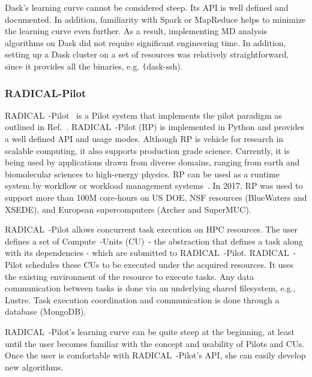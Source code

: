 Dask's learning curve cannot be considered steep.
Its API is well defined and documented.
In addition, familiarity with Spark or MapReduce helps to minimize the learning curve even further.
As a result, implementing MD analysis algorithms on Dask did not require significant engineering time.
In addition, setting up a Dask cluster on a set of resources was relatively straightforward, since it provides all the binaries, e.g. \texttt(dask-ssh).

\subsubsection*{RADICAL-Pilot}
RADICAL~-Pilot~\cite{merzky2019using} is a Pilot system that implements the pilot paradigm as outlined in Ref.~\cite{turilli2018comprehensive}.
RADICAL~-Pilot (RP) is implemented in Python and provides a well defined API and usage modes.
Although RP is vehicle for research in scalable computing, it also supports production grade science.
Currently, it is being used by applications drawn from diverse domains, ranging from earth and biomolecular sciences to high-energy physics.
RP can be used as a runtime system by workflow or workload management systems~\cite{turilli2019middleware,treikalis2016repex,balasubramanian2018harnessing,dakka2018high,turilli2017evaluating}.
In 2017, RP was used to support more than 100M core-hours on US DOE, NSF resources (BlueWaters and XSEDE), and European supercomputers (Archer and SuperMUC).

RADICAL~-Pilot allows concurrent task execution on HPC resources.
The user defines a set of Compute~-Units (CU)~- the abstraction that defines a task along with its dependencies - which are submitted to RADICAL~-Pilot.
RADICAL~-Pilot schedules these CUs to be executed under the acquired resources.
It uses the existing environment of the resource to execute tasks.
Any data communication between tasks is done via an underlying shared filesystem, e.g., Lustre.
Task execution coordination and communication is done through a database (MongoDB).

RADICAL~-Pilot's learning curve can be quite steep at the beginning, at least until the user becomes familiar with the concept and usability of Pilots and CUs.
Once the user is comfortable with RADICAL~-Pilot's API, she can easily develop new algorithms.

